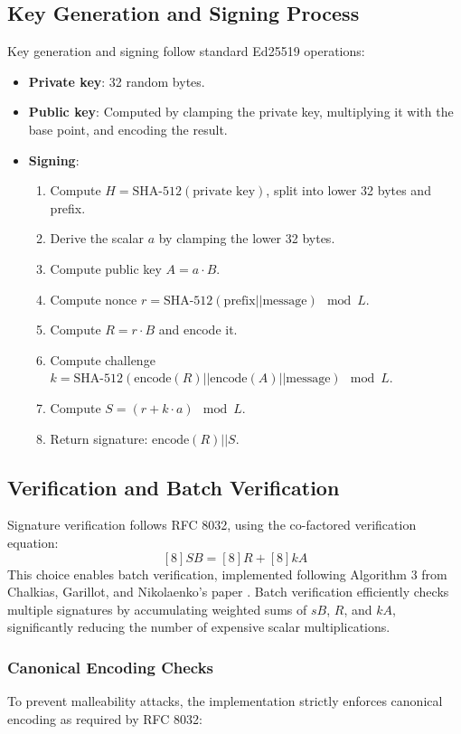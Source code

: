 \documentclass[twoside,a4paper,12pt]{article}
\begin{document}
\subsection{Key Generation and Signing Process}
Key generation and signing follow standard Ed25519 operations:

\begin{itemize}
    \item \textbf{Private key}: 32 random bytes.
    \item \textbf{Public key}: Computed by clamping the private key, multiplying it with the base point, and encoding the result.
    \item \textbf{Signing}:  
    \begin{enumerate}
        \item Compute $H = \text{SHA-512}(\text{private key})$, split into lower 32 bytes and prefix.
        \item Derive the scalar $a$ by clamping the lower 32 bytes.
        \item Compute public key $A = a \cdot B$.
        \item Compute nonce $r = \text{SHA-512}(\text{prefix} || \text{message}) \mod L$.
        \item Compute $R = r \cdot B$ and encode it.
        \item Compute challenge $k = \text{SHA-512}(\text{encode}(R) || \text{encode}(A) || \text{message}) \mod L$.
        \item Compute $S = (r + k \cdot a) \mod L$.
        \item Return signature: $\text{encode}(R) || S$.
    \end{enumerate}
\end{itemize}

\subsection{Verification and Batch Verification}
Signature verification follows RFC 8032, using the co-factored verification equation:
\[
[8] S B = [8] R + [8] k A
\]
This choice enables batch verification, implemented following Algorithm 3 from Chalkias, Garillot, and Nikolaenko's paper \cite{taming}. Batch verification efficiently checks multiple signatures by accumulating weighted sums of $sB$, $R$, and $kA$, significantly reducing the number of expensive scalar multiplications.

\subsubsection{Canonical Encoding Checks}
To prevent malleability attacks, the implementation strictly enforces canonical encoding as required by RFC 8032:
\end{document}
